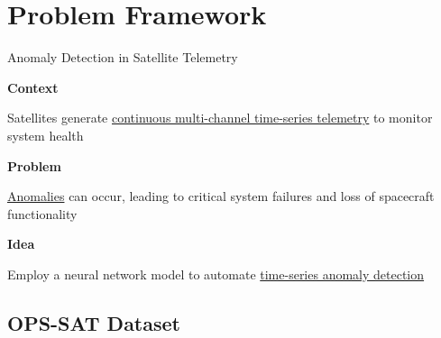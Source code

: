 \section{Problem Framework}

\begin{frame}{Anomaly Detection in Satellite Telemetry}
   \begin{center}
      \Large\textcolor{BrickRed}{\textbf{Context}}

      \vspace{0.25cm}

      \small{Satellites generate \underline{continuous multi-channel time-series telemetry} to monitor system health}
   \end{center}

   \pause
   \vfill

   \begin{center}
      \Large\textcolor{BrickRed}{\textbf{Problem}}

      \vspace{0.25cm}

      \small{\underline{Anomalies} can occur, leading to critical system failures and loss of spacecraft functionality}
   \end{center}

   \pause
   \vfill

   \begin{center}
      \Large\textcolor{BrickRed}{\textbf{Idea}}

      \vspace{0.25cm}

      \small{Employ a neural network model to automate \underline{time-series anomaly detection}}
   \end{center}
\end{frame}

\subsection{OPS-SAT Dataset}

